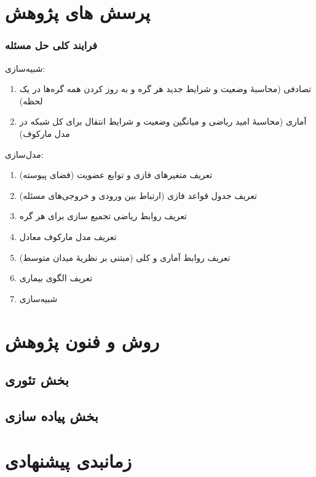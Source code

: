 \documentclass[xcolor=dvipsnames, professionalfonts, aspectratio=169, 11pt]{beamer}
\begin{document}
\section{پرسش های پژوهش}
\begin{frame}
    \frametitle{فرایند کلی حل مسئله}
    {
        شبیه‌سازی:
        \begin{enumerate}\RTList
            \item<-1> تصادفی (محاسبهٔ وضعیت و شرایط جدید هر گره و به روز کردن همه گره‌ها در یک لحظه)
            \item<2-> آماری (محاسبهٔ امید ریاضی و میانگین وضعیت و شرایط انتقال برای کل شبکه در مدل مارکوف)

        \end{enumerate}

        مدل‌سازی:
        \begin{enumerate}\RTList
            \item تعریف متغیرهای فازی و توابع عضویت (فضای پیوسته)
            \item تعریف جدول قواعد فازی (ارتباط بین ورودی و خروجی‌های مسئله)
            \item تعریف روابط ریاضی تجمیع سازی برای هر گره
            \item<2-> تعریف مدل مارکوف معادل
            \item<2-> تعریف روابط آماری و کلی (مبتنی بر نظریهٔ میدان متوسط)
            \item<1> تعریف الگوی بیماری
            \item شبیه‌سازی

        \end{enumerate}
    }
\end{frame}

\section{روش و فنون پژوهش}
\subsection{بخش تئوری}
\subsection{بخش پیاده سازی}

\section{زمانبدی پیشنهادی }
\end{document}
